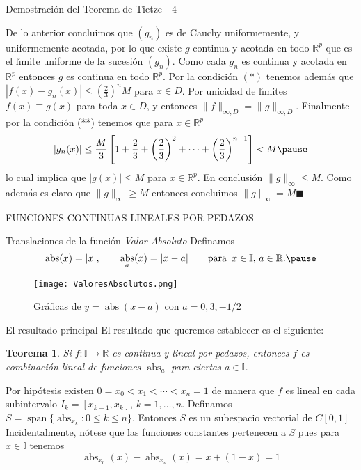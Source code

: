 \documentclass[xcolor=dvipsnames,10pt,handout, draft]{beamer}
\DeclareMathOperator{\gene}{span}
\DeclareMathOperator{\abs}{abs}
\newcommand{\rz}{\mathbb R}
\newcommand{\rzp}{\mathbb R^{p}}
\newcommand{\intunit}{\mathbb I}
\newtheorem*{teo}{Teorema}
\begin{document}
\begin{frame}{Demostraci\'on del Teorema de Tietze - 4}

De lo anterior concluimos que $(g_n)$ es de Cauchy uniformemente, y uniformemente acotada, por lo que existe $g$ continua y acotada en todo $\rzp$ que es el l\'\i mite uniforme de la sucesi\'on $(g_n)$.
\vskip4pt\pause
Como cada $g_n$ es continua y acotada en $\rzp$ entonces $g$ es continua en todo $\rzp$.
\pause\vskip4pt
Por la condici\'on $(*)$ tenemos adem\'as que $|f(x)-g_n(x)|\leq\left(\frac{2}{3}\right)^nM$ para $x\in D$.
\pause\vskip4pt
Por unicidad de l\'\i mites $f(x)\equiv g(x)$ para toda $x\in D$, y entonces $\|f\|_{\infty,D}=\|g\|_{\infty,D}$.
\pause\vskip4pt
Finalmente por la condici\'on (**) tenemos que para $x\in \rzp$
$$|g_n(x)|\leq \frac{M}{3}\left[1+\frac{2}{3}+\left(\frac{2}{3}\right)^2+\cdots+\left(\frac{2}{3}\right)^{n-1}\right]< M\pause$$
lo cual implica que $|g(x)|\leq M$ para $x\in\rzp$. \pause En conclusi\'on $\|g\|_{\infty}\leq M$.
\pause\vskip4pt
Como adem\'as es claro que $\|g\|_{\infty}\geq M$ entonces concluimos $\|g\|_{\infty}= M$\hfill$\blacksquare$
\end{frame}



\begin{frame}

FUNCIONES CONTINUAS LINEALES POR PEDAZOS

\end{frame}


\begin{frame}{Translaciones de la funci\'on {\em Valor Absoluto}}
Definamos 
$$\abs(x)=|x|,\qquad\abs_a(x)=|x-a|\qquad\text{para }\,x\in\intunit,\,a\in\rz.\pause$$

\begin{figure}
\texttt{[image: ValoresAbsolutos.png]}
\caption{Gr\'aficas de $y=\abs(x-a)$  con $a=0, 3, -1/2$}
\end{figure}

\end{frame}


\begin{frame}{El resultado principal}
El resultado que queremos establecer es el siguiente:

\begin{teo}
Si $f:\intunit\to\rz$ es continua y lineal por pedazos, entonces $f$ es combinaci\'on lineal de funciones $\abs_a$ para ciertas $a\in\intunit$.\pause
\end{teo}

Por hip\'otesis existen $0=x_0<x_1<\cdots<x_n=1$ de manera que $f$ es lineal en cada subintervalo $I_k=[x_{k-1},x_k]$, $k=1,\dots,n$.
\vskip5pt\pause
Definamos $S=\gene\big\{\abs_{x_k}:0\leq k\leq n\big\}$. \pause Entonces $S$ es un subespacio vectorial de $C[0,1]$
\vskip5pt\pause
Incidentalmente, n\'otese que las funciones constantes pertenecen a $S$ pues para $x\in\intunit$ tenemos
$$\abs_{x_0}(x)-\abs_{x_n}(x)=x+(1-x)=1$$
\end{frame}
\end{document}
